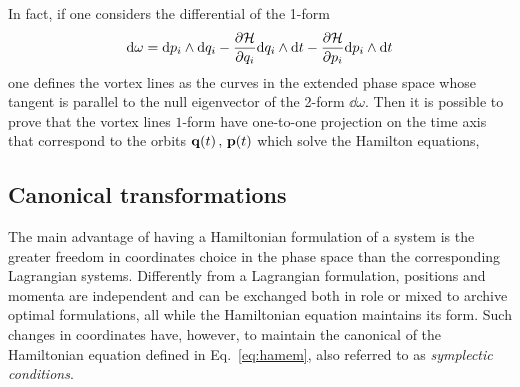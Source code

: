 In fact, if one considers the differential of the 1-form
\begin{equation}
    \dd\omega= \dd p_i\wedge \dd q_i-\pdv{\mathcal{H}}{q_i}\dd q_i \wedge \dd t-\pdv{\mathcal{H}}{p_i} \dd p_i \wedge \dd t
    \label{dome}
\end{equation}
one defines the vortex lines as the curves in the extended phase space whose tangent is parallel to the null eigenvector of the 2-form $\dd\omega$. Then it is possible to prove that the vortex lines $1$-form have one-to-one projection on the time axis that correspond to the orbits $\vb{q}(t)\, , \, \vb{p}(t)$ which solve the Hamilton equations, 

\begin{comment}
is described by the motion of a particle in the time interval $[t_0,\,t_1]$ yields
\begin{equation}
    \int_{q_0=q(t_0)}^{q_1=q(t_1)} \qty(p_i \dd q_i - \ham \dd t) = \int_{t_0}^{t_1} \qty(p_i \dv{q_i}{t} - \ham)\dd t =  \int_{t_0}^{t_1} \mathcal{L} \dd t\,, 
\end{equation}
where $\mathcal{L}=p_i\dot q_i - \ham$ is the Lagrangian, obtained by the Legendre transformation of the Hamiltonian. 
\end{comment}
\subsection{Canonical transformations}

The main advantage of having a Hamiltonian formulation of a system is the greater freedom in coordinates choice in the phase space than the corresponding Lagrangian systems. Differently from a Lagrangian formulation, positions and momenta are independent and can be exchanged both in role or mixed to archive optimal formulations, all while the Hamiltonian equation maintains its form. Such changes in coordinates have, however, to maintain the canonical of the Hamiltonian equation defined in Eq.~\eqref{eq:hamem}, also referred to as \textit{symplectic conditions}.

